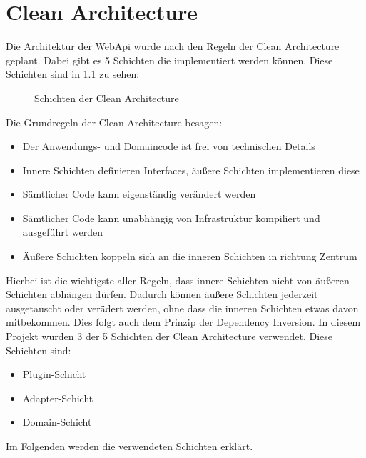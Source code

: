 \chapter{Clean Architecture}
Die Architektur der WebApi wurde nach den Regeln der Clean Architecture geplant. Dabei gibt es 5 Schichten die implementiert werden können. Diese Schichten sind in \ref{cleanArchitecture} zu sehen:
\begin{figure}[htbp]
    \centering
    \caption{\label{cleanArchitecture} Schichten der Clean Architecture}
\end{figure}
Die Grundregeln der Clean Architecture besagen:
\begin{itemize}
    \item Der Anwendungs- und Domaincode ist frei von technischen Details
    \item Innere Schichten definieren Interfaces, äußere Schichten implementieren diese
    \item Sämtlicher Code kann eigenständig verändert werden
    \item Sämtlicher Code kann unabhängig von Infrastruktur kompiliert und ausgeführt werden
    \item Äußere Schichten koppeln sich an die inneren Schichten in richtung Zentrum
\end{itemize}
Hierbei ist die wichtigste aller Regeln, dass innere Schichten nicht von äußeren Schichten abhängen dürfen. Dadurch können äußere Schichten jederzeit ausgetauscht oder verädert werden, ohne dass die inneren Schichten etwas davon mitbekommen. 
Dies folgt auch dem Prinzip der Dependency Inversion.
\newline In diesem Projekt wurden 3 der 5 Schichten der Clean Architecture verwendet. Diese Schichten sind:
\begin{itemize}
    \item Plugin-Schicht
    \item Adapter-Schicht
    \item Domain-Schicht
\end{itemize}
Im Folgenden werden die verwendeten Schichten erklärt.
